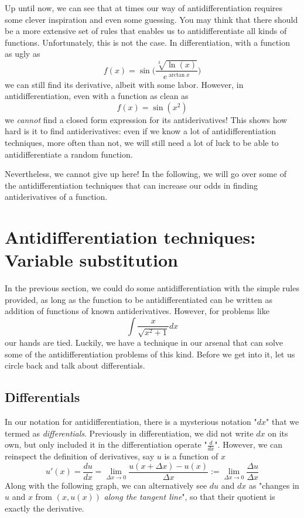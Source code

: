 Up until now, we can see that at times our way of antidifferentiation requires some clever inspiration and even some guessing.  You may think that there should be a more extensive set of rules that enables us to antidifferentiate all kinds of functions.  Unfortunately, this is not the case.  In differentiation, with a function as ugly as 
\[f(x) = \sin\Big(\frac{\sqrt[3]{\ln(x)}}{e^{\arctan x}}\Big)\]
we can still find its derivative, albeit with some labor.  However, in antidifferentiation, even with a function as clean as
\[f(x) = \sin(x^2)\]
we \textit{cannot} find a closed form expression for its antiderivatives!  This shows how hard is it to find antiderivatives: even if we know a lot of antidifferentiation techniques, more often than not, we will still need a lot of luck to be able to antidifferentiate a random function.  

Nevertheless, we cannot give up here!  In the following, we will go over some of the antidifferentiation techniques that can increase our odds in finding antiderivatives of a function.

\newpage

\section{Antidifferentiation techniques: Variable substitution}
In the previous section, we could do some antidifferentiation with the simple rules provided, as long as the function to be antidifferentiated can be written as addition of functions of known antiderivatives.  However, for problems like
\[\int \frac{x}{\sqrt{x^2+1}} dx\]
our hands are tied.  Luckily, we have a technique in our arsenal that can solve some of the antidifferentiation problems of this kind.  Before we get into it, let us circle back and talk about differentials.

\subsection{Differentials}
In our notation for antidifferentiation, there is a mysterious notation "$dx$" that we termed as \textit{differentials}.  Previously in differentiation, we did not write $dx$ on its own, but only included it in the differentiation operate "$\frac{d}{dx}$".  However, we can reinspect the definition of derivatives, say $u$ is a function of $x$
\[u'(x) = \frac{du}{dx} = \lim_{\Delta x \rightarrow 0} \frac{u(x+\Delta x) - u(x)}{\Delta x} := \lim_{\Delta x \rightarrow 0} \frac{\Delta u}{\Delta x}\]
Along with the following graph, we can alternatively see $du$ and $dx$ as "changes in $u$ and $x$ from $(x, u(x))$ \textit{along the tangent line}", so that their quotient is exactly the derivative.  

